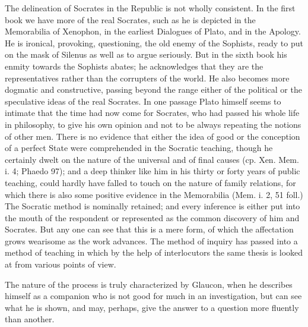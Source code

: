The delineation of Socrates in the Republic is not wholly consistent. In the first book we have more of the real Socrates, such as he is depicted in the Memorabilia of Xenophon, in the earliest Dialogues of Plato, and in the Apology. He is ironical, provoking, questioning, the old enemy of the Sophists, ready to put on the mask of Silenus as well as to argue seriously. But in the sixth book his enmity towards the Sophists abates; he acknowledges that they are the representatives rather than the corrupters of the world. He also becomes more dogmatic and constructive, passing beyond the range either of the political or the speculative ideas of the real Socrates. In one passage Plato himself seems to intimate that the time had now come for Socrates, who had passed his whole life in philosophy, to give his own opinion and not to be always repeating the notions of other men. There is no evidence that either the idea of good or the conception of a perfect State were comprehended in the Socratic teaching, though he certainly dwelt on the nature of the universal and of final causes (cp. Xen. Mem. i. 4; Phaedo 97); and a deep thinker like him in his thirty or forty years of public teaching, could hardly have falled to touch on the nature of family relations, for which there is also some positive evidence in the Memorabilia (Mem. i. 2, 51 foll.) The Socratic method is nominally retained; and every inference is either put into the mouth of the respondent or represented as the common discovery of him and Socrates. But any one can see that this is a mere form, of which the affectation grows wearisome as the work advances. The method of inquiry has passed into a method of teaching in which by the help of interlocutors the same thesis is looked at from various points of view.

The nature of the process is truly characterized by Glaucon, when he describes himself as a companion who is not good for much in an investigation, but can see what he is shown, and may, perhaps, give the answer to a question more fluently than another.

